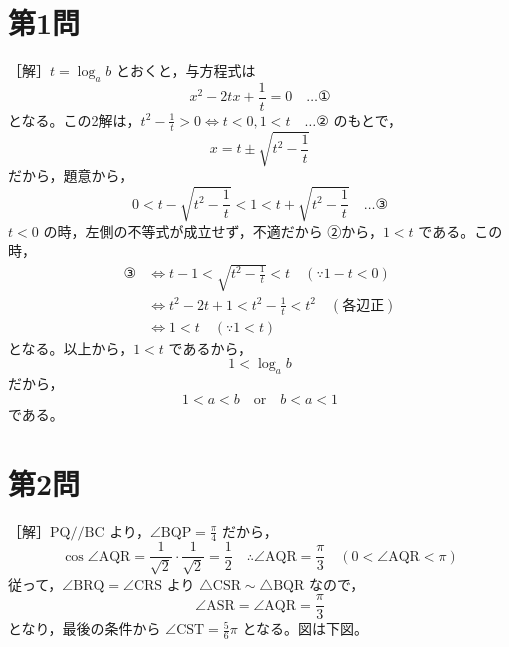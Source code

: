 \documentclass[../main.tex]{subfiles}
\begin{document}
\section*{第1問}

［解］$t = \log_a b$ とおくと，与方程式は
\[
  x^2 - 2tx + \frac{1}{t} = 0 \quad \dots \text{①}
\]
となる。この2解は，$t^2 - \frac{1}{t} > 0 \iff t < 0, 1 < t \quad \dots \text{②}$ のもとで，
\[
  x = t \pm \sqrt{t^2 - \frac{1}{t}}
\]
だから，題意から，
\[
  0 < t - \sqrt{t^2 - \frac{1}{t}} < 1 < t + \sqrt{t^2 - \frac{1}{t}} \quad \dots \text{③}
\]
$t < 0$ の時，左側の不等式が成立せず，不適だから ②から，$1 < t$ である。この時，
\begin{align*}
  ③ &\iff t - 1 < \sqrt{t^2 - \frac{1}{t}} < t \quad (\because 1 - t < 0) \\
  &\iff t^2 - 2t + 1 < t^2 - \frac{1}{t} < t^2 \quad (\text{各辺正}) \\
  &\iff 1 < t \quad (\because 1 < t)
\end{align*}
となる。以上から，$1 < t$ であるから，
\[
  1 < \log_a b
\]
だから，
\[
  1 < a < b \quad \text{or} \quad b < a < 1
\]
である。

\newpage

\section*{第2問}

［解］$\mathrm{PQ} \mathbin{/\!/} \mathrm{BC}$ より，$\angle \mathrm{BQP} = \frac{\pi}{4}$ だから，
\[
  \cos \angle \mathrm{AQR} = \frac{1}{\sqrt{2}} \cdot \frac{1}{\sqrt{2}} = \frac{1}{2} \quad \therefore \angle \mathrm{AQR} = \frac{\pi}{3} \quad \left(0 < \angle \mathrm{AQR} < \pi\right)
\]
従って，$\angle \mathrm{BRQ} = \angle \mathrm{CRS}$ より $\triangle \mathrm{CSR} \mathbin{\sim} \triangle \mathrm{BQR}$ なので，
\[
  \angle \mathrm{ASR} = \angle \mathrm{AQR} = \frac{\pi}{3}
\]
となり，最後の条件から $\angle \mathrm{CST} = \frac{5}{6}\pi$ となる。図は下図。
\end{document}
